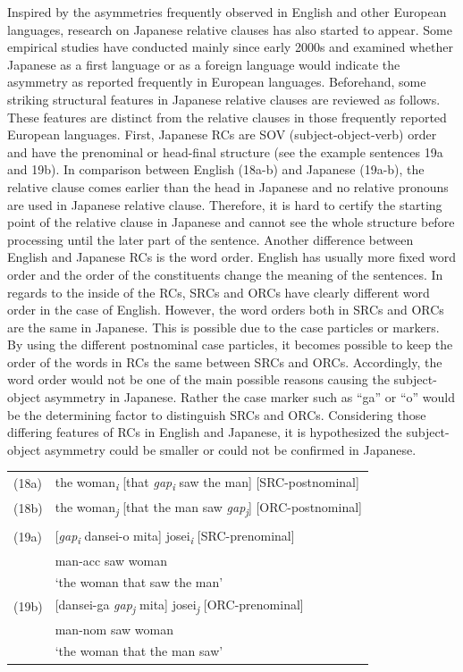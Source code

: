 \documentclass[
]{article}
\begin{document}
Inspired by the asymmetries frequently observed in English and other
European languages, research on Japanese relative clauses has also
started to appear. Some empirical studies have conducted mainly since
early 2000s and examined whether Japanese as a first language or as a
foreign language would indicate the asymmetry as reported frequently in
European languages. Beforehand, some striking structural features in
Japanese relative clauses are reviewed as follows. These features are
distinct from the relative clauses in those frequently reported European
languages. First, Japanese RCs are SOV (subject-object-verb) order and
have the prenominal or head-final structure (see the example sentences
19a and 19b). In comparison between English (18a-b) and Japanese
(19a-b), the relative clause comes earlier than the head in Japanese and
no relative pronouns are used in Japanese relative clause. Therefore, it
is hard to certify the starting point of the relative clause in Japanese
and cannot see the whole structure before processing until the later
part of the sentence. Another difference between English and Japanese
RCs is the word order. English has usually more fixed word order and the
order of the constituents change the meaning of the sentences. In
regards to the inside of the RCs, SRCs and ORCs have clearly different
word order in the case of English. However, the word orders both in SRCs
and ORCs are the same in Japanese. This is possible due to the case
particles or markers. By using the different postnominal case particles,
it becomes possible to keep the order of the words in RCs the same
between SRCs and ORCs. Accordingly, the word order would not be one of
the main possible reasons causing the subject-object asymmetry in
Japanese. Rather the case marker such as ``ga'' or ``o'' would be the
determining factor to distinguish SRCs and ORCs. Considering those
differing features of RCs in English and Japanese, it is hypothesized
the subject-object asymmetry could be smaller or could not be confirmed
in Japanese.

\vspace{1em}

\noindent
\begin{tabularx}{\linewidth}{@{}lX@{}}
(18a) & the woman\textsubscript{\textit{i}} [that \textit{gap}\textsubscript{\textit{i}} saw the man] \hfill [SRC-postnominal] \\
(18b) & the woman\textsubscript{\textit{j}} [that the man saw \textit{gap}\textsubscript{\textit{j}}] \hfill [ORC-postnominal] \\
      & \\
(19a) & [\textit{gap}\textsubscript{\textit{i}} dansei-o mita] josei\textsubscript{\textit{i}} \hfill [SRC-prenominal] \\
      & man-acc saw woman \\
      & ‘the woman that saw the man’ \\
(19b) & [dansei-ga \textit{gap}\textsubscript{\textit{j}} mita] josei\textsubscript{\textit{j}} \hfill [ORC-prenominal] \\
      & man-nom saw woman \\
      & ‘the woman that the man saw’ \\
\end{tabularx}
\end{document}
